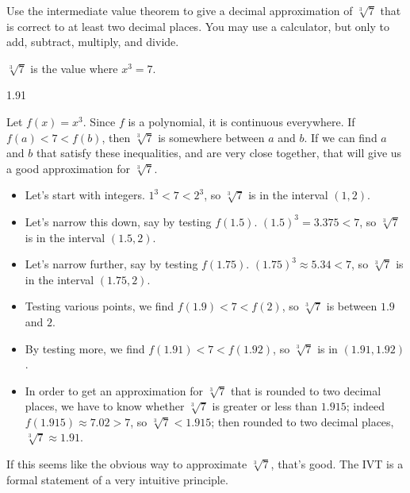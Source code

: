 \begin{question}Use the intermediate value theorem to give a decimal approximation of $\sqrt[3]{7}$ that is correct to at least two decimal places. You may use a calculator, but only to add, subtract, multiply, and divide.
\end{question}
\begin{hint} $\sqrt[3]{7}$ is the value where $x^3=7$.
\end{hint}
\begin{answer} 1.91
\end{answer}
\begin{solution}
Let $f(x)=x^3$. Since $f$ is a polynomial, it is continuous everywhere. If $f(a)<7<f(b)$, then $\sqrt[3]{7}$ is somewhere between $a$ and $b$. If we can find $a$ and $b$ that satisfy these inequalities, and are very close together, that will give us a good approximation for $\sqrt[3]{7}$.

\begin{itemize}
\item Let's start with integers. $1^3<7<2^3$, so $\sqrt[3]{7}$ is in the interval $(1,2)$.
\item Let's narrow this down, say by testing $f(1.5)$. $(1.5)^3 = 3.375<7$, so $\sqrt[3]{7}$ is in the interval $(1.5,2)$.
\item  Let's narrow further, say by testing $f(1.75)$. $(1.75)^3\approx 5.34<7$, so $\sqrt[3]{7}$ is in the interval $(1.75,2)$.
\item Testing various points, we find $f(1.9)<7<f(2)$, so $\sqrt[3]{7}$ is between $1.9$ and $2$.
\item By testing more, we find
$f(1.91)<7<f(1.92)$, so $\sqrt[3]{7}$ is in $(1.91,1.92)$.
\item In order to get an approximation for $\sqrt[3]{7}$ that is rounded to two decimal places, we have to know whether $\sqrt[3]{7}$ is greater or less than $1.915$; indeed $f(1.915) \approx 7.02>7$, so
$\sqrt[3]{7}<1.915$; then rounded to two decimal places, $\sqrt[3]{7}\approx 1.91$.
\end{itemize}
If this seems like the obvious way to approximate $\sqrt[3]{7}$, that's good. The IVT is a formal statement of a very intuitive principle.
\end{solution}




